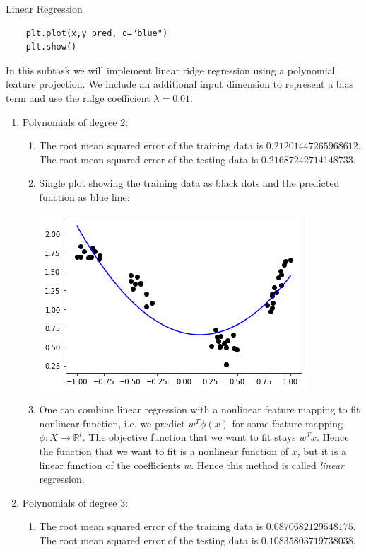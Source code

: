 \begin{task}{Linear Regression}
\begin{subtask}
\begin{enumerate}
\begin{lstlisting}
    plt.plot(x,y_pred, c="blue")
    plt.show()
\end{lstlisting}
\end{enumerate}
\end{subtask}
\begin{subtask}
In this subtask we will implement linear ridge regression using a polynomial feature projection. We include an additional input dimension to represent a bias term and use the ridge coefficient $\lambda = 0.01$.
\begin{enumerate}
\item Polynomials of degree 2:
\begin{enumerate}
\item The root mean squared error of the training data is $0.21201447265968612$. The root mean squared error of the testing data is $0.21687242714148733$.
\item Single plot showing the training data as black dots and the predicted function as blue line:
\begin{center}
\includegraphics{Figure_1b_2.png}
\end{center}
\item One can combine linear regression with a nonlinear feature mapping to fit nonlinear function, i.e. we predict $w^T \phi(x)$ for some feature mapping $\phi : X \to \mathbb{R}^t$. The objective function that we want to fit stays $w^T x$. Hence the function that we want to fit is a nonlinear function of $x$,  but it is a linear function of the coefficients $w$. Hence this method is called \textit{linear} regression. 
\end{enumerate}
\item Polynomials of degree 3:
\begin{enumerate}
\item The root mean squared error of the training data is $0.0870682129548175$. The root mean squared error of the testing data is $0.10835803719738038$.

\end{enumerate}
\end{enumerate}
\end{subtask}
\end{task}
